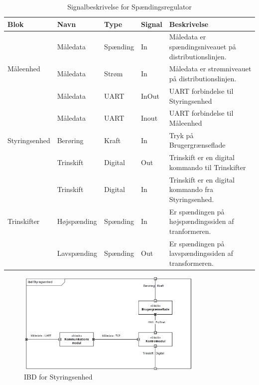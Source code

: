 \begin{table}[H]
	\centering
	\begin{tabular}{|l|l|l|l|p{4cm}|}
		\hline
		\textbf{Blok} & \textbf{Navn} & \textbf{Type} & \textbf{Signal} & 
		\textbf{Beskrivelse} \\\hline
		
		\multirow{3}{*}{Måleenhed} 
		& Måledata & Spænding & In & Måledata er spændingsniveauet på distributionslinjen. \\\hhline{~----} 
		& Måledata & Strøm & In & Måledata er strømniveauet på distributionslinjen. \\\hhline{~----} 
		& Måledata & UART & InOut & UART forbindelse til Styringsenhed \\\hline
		
		\multirow{3}{*}{Styringsenhed} 
		& Måledata & UART & Inout & UART forbindelse til Måleenhed \\\hhline{~----} 
		& Berøring & Kraft & In & Tryk på Brugergrænseflade \\\hhline{~----} 
		& Trinskift & Digital & Out & Trinskift er en digital kommando til Trinskifter \\\hline
		
		\multirow{3}{*}{Trinskifter} 
		& Trinskift & Digital & In & Trinskift er en digital kommando fra Styringsenhed. \\\hhline{~----} 
		& Højspænding & Spænding & In & Er spændingen på højspændingssiden af tranformeren. \\\hhline{~----} 
		& Lavspænding & Spænding & Out & Er spændingen på lavspændingssiden af transformeren. \\\hline
	\end{tabular}
	\caption{Signalbeskrivelse for Spændingsregulator}
	\label{tab:SignalbeskrivelseSp}
	
\end{table}


\begin{figure}[htbp] %
	\centering
	\includegraphics[width=0.8\textwidth]{Figure/IBDStyringsenhed1}
	\caption{IBD for Styringsenhed}
	\label{fig:IBDSt}
\end{figure}

